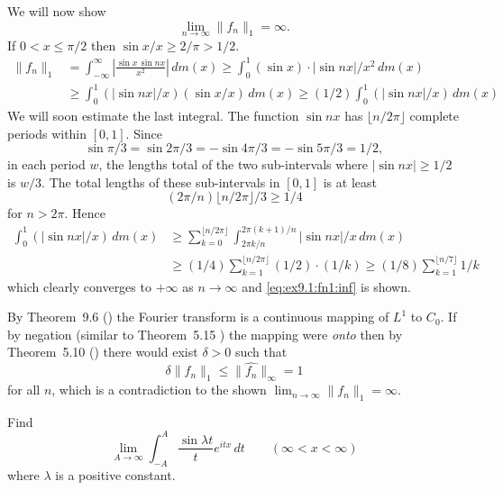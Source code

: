 \begin{enumerate}
We will now show
\begin{equation} \label{eq:ex9.1:fn1:inf}
\lim_{n\to\infty}\|f_n\|_1 = \infty.
\end{equation}
If \(0<x\leq\pi/2\) then \(\sin x/x \geq 2/\pi > 1/2\).
\begin{align*}
\|f_n\|_1
&= \int_{-\infty}^\infty \left|\frac{\sin x\,\sin nx}{x^2}\right|\,dm(x)
 \geq \int_0^1 (\sin x)\cdot|\sin nx|/x^2\,dm(x) \\
&\geq \int_0^1 (|\sin nx|/x)(\sin x/x)\,dm(x)
 \geq (1/2)\int_0^1 (|\sin nx|/x)\,dm(x)
\end{align*}
We will soon estimate the last integral.
The function \(\sin nx\) has \(\lfloor n/2\pi \rfloor\)
complete periods within \([0,1]\).
Since
\begin{equation*}
\sin \pi/3 = \sin 2\pi/3 = -\sin 4\pi/3 = -\sin 5\pi/3 = 1/2,
\end{equation*}
in each period $w$,
the lengths total of the two sub-intervals where \(|\sin nx| \geq 1/2\)
is \(w/3\). The total lengths of these sub-intervals in \([0,1]\)
is at least
\begin{equation*}
(2\pi/n) \lfloor n/2\pi \rfloor / 3 \geq 1/4
\end{equation*}
for \(n>2\pi\).
Hence
\begin{align*}
\int_0^1 (|\sin nx|/x)\,dm(x)
&\geq \sum_{k=0}^{\lfloor n/2\pi \rfloor}
  \int_{2\pi k/n}^{2\pi(k+1)/n} |\sin nx|/x\,dm(x) \\
&\geq (1/4)\sum_{k=1}^{\lfloor n/2\pi \rfloor}
         (1/2)\cdot (1/k)
 \geq (1/8)\sum_{k=1}^{\lfloor n/7\rfloor} 1/k
\end{align*}
which clearly converges to \(+\infty\) as \(n\to\infty\)
and \eqref{eq:ex9.1:fn1:inf} is shown.


By Theorem~9.6 (\cite{RudinRCA87}) the Fourier transform 
is a continuous mapping of \(L^1\) to \(C_0\).
If by negation (similar to Theorem~5.15 \cite{RudinRCA87})
the mapping were \emph{onto} then by Theorem~5.10 (\cite{RudinRCA87})
there would exist \(\delta>0\) such that 
\begin{equation*}
 \delta \|f_n\|_1 \leq \|\hat{f_n}\|_\infty = 1
\end{equation*}
for all $n$, which is a contradiction to the shown \(\lim_{n\to\infty}\|f_n\|_1 = \infty\).

\begin{excopy}
Find
\begin{equation*}
\lim_{A\to\infty} \int_{-A}^A \frac{\sin \lambda t}{t}e^{itx}\,dt
  \qquad (\infty < x < \infty)
\end{equation*}
where \(\lambda\) is a positive constant.
\end{excopy}


\end{enumerate}
